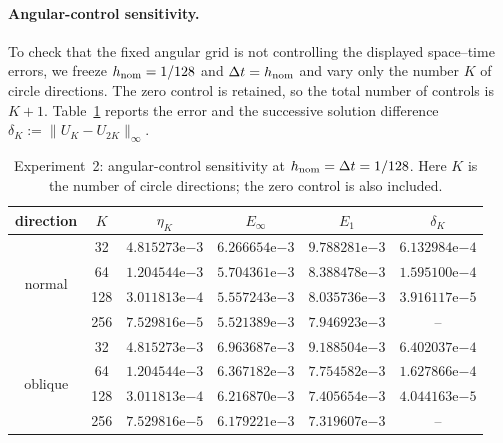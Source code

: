 \documentclass[11pt]{article}
\theoremstyle{definition}
\theoremstyle{remark}
\begin{document}
\paragraph{Angular-control sensitivity.}
To check that the fixed angular grid is not controlling the displayed
space--time errors, we freeze $h_{\rm nom}=1/128$ and
$\Delta t=h_{\rm nom}$ and vary only the number $K$ of circle directions.
The zero control is retained, so the total number of controls is $K+1$.
Table~\ref{tab:ex2-control-sensitivity} reports the error and the successive
solution difference
$\delta_K:=\|U_K-U_{2K}\|_\infty$.

\begin{table}[htbp]
 \centering
 \footnotesize
 \setlength{\tabcolsep}{4.2pt}
 \renewcommand{\arraystretch}{0.92}
 \caption{Experiment~2: angular-control sensitivity at
 $h_{\rm nom}=\Delta t=1/128$.  Here $K$ is the number of circle directions;
 the zero control is also included.}
 \label{tab:ex2-control-sensitivity}
 \begin{tabular}{cccccc}
  \toprule
  direction & $K$ & $\eta_K$ & $E_\infty$ & $E_1$ & $\delta_K$\\
  \midrule
  \multirow{4}{*}{normal}
  & 32  & $4.815273\mathrm e{-3}$ & $6.266654\mathrm e{-3}$ & $9.788281\mathrm e{-3}$ & $6.132984\mathrm e{-4}$\\
  & 64  & $1.204544\mathrm e{-3}$ & $5.704361\mathrm e{-3}$ & $8.388478\mathrm e{-3}$ & $1.595100\mathrm e{-4}$\\
  & 128 & $3.011813\mathrm e{-4}$ & $5.557243\mathrm e{-3}$ & $8.035736\mathrm e{-3}$ & $3.916117\mathrm e{-5}$\\
  & 256 & $7.529816\mathrm e{-5}$ & $5.521389\mathrm e{-3}$ & $7.946923\mathrm e{-3}$ & --\\
  \midrule
  \multirow{4}{*}{oblique}
  & 32  & $4.815273\mathrm e{-3}$ & $6.963687\mathrm e{-3}$ & $9.188504\mathrm e{-3}$ & $6.402037\mathrm e{-4}$\\
  & 64  & $1.204544\mathrm e{-3}$ & $6.367182\mathrm e{-3}$ & $7.754582\mathrm e{-3}$ & $1.627866\mathrm e{-4}$\\
  & 128 & $3.011813\mathrm e{-4}$ & $6.216870\mathrm e{-3}$ & $7.405654\mathrm e{-3}$ & $4.044163\mathrm e{-5}$\\
  & 256 & $7.529816\mathrm e{-5}$ & $6.179221\mathrm e{-3}$ & $7.319607\mathrm e{-3}$ & --\\
  \bottomrule
 \end{tabular}
\end{table}
\end{document}
